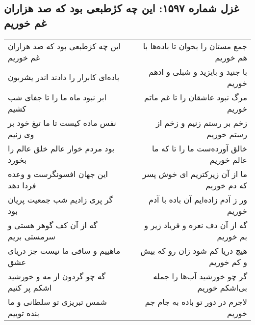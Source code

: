 \begin{center}
\section*{غزل شماره ۱۵۹۷: این چه کژطبعی بود که صد هزاران غم خوریم}
\label{sec:1597}
\begin{longtable}{l p{0.5cm} r}
این چه کژطبعی بود که صد هزاران غم خوریم
&&
جمع مستان را بخوان تا باده‌ها با هم خوریم
\\
باده‌ای کابرار را دادند اندر یشربون
&&
با جنید و بایزید و شبلی و ادهم خوریم
\\
ابر نبود ماه ما را تا جفای شب کشیم
&&
مرگ نبود عاشقان را تا غم ماتم خوریم
\\
نفس ماده کیست تا ما تیغ خود بر وی زنیم
&&
زخم بر رستم زنیم و زخم از رستم خوریم
\\
بود مردم خوار عالم خلق عالم را بخورد
&&
خالق آورده‌ست ما را تا که ما عالم خوریم
\\
این جهان افسونگرست و وعده فردا دهد
&&
ما از آن زیرکتریم ای خوش پسر که دم خوریم
\\
گر پری زادیم شب جمعیت پریان بود
&&
ور ز آدم زاده‌ایم آن باده با آدم خوریم
\\
گه از آن کف گوهر هستی و سرمستی بریم
&&
گه از آن دف نعره و فریاد زیر و بم خوریم
\\
ماهییم و ساقی ما نیست جز دریای عشق
&&
هیچ دریا کم شود زان رو که بیش و کم خوریم
\\
گه چو گردون از مه و خورشید اشکم پر کنیم
&&
گر چو خورشید آب‌ها را جمله بی‌اشکم خوریم
\\
شمس تبریزی تو سلطانی و ما بنده توییم
&&
لاجرم در دور تو باده به جام جم خوریم
\\
\end{longtable}
\end{center}
